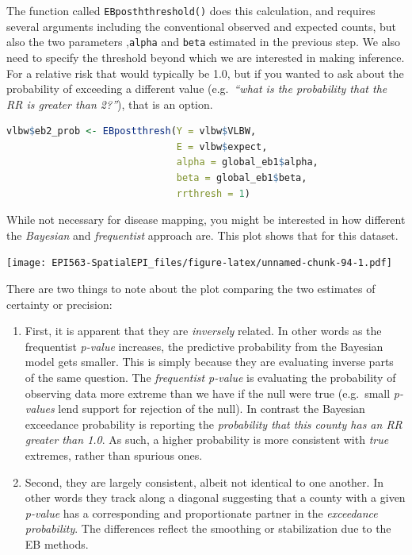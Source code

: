 \documentclass[
]{book}
\newcommand{\passthrough}[1]{#1}
\providecommand{\tightlist}{%
  \setlength{\itemsep}{0pt}\setlength{\parskip}{0pt}}
\begin{document}
The function called \passthrough{\lstinline!EBposththreshold()!} does this calculation, and requires several arguments including the conventional observed and expected counts, but also the two parameters ,\passthrough{\lstinline!alpha!} and \passthrough{\lstinline!beta!} estimated in the previous step. We also need to specify the threshold beyond which we are interested in making inference. For a relative risk that would typically be 1.0, but if you wanted to ask about the probability of exceeding a different value (e.g.~\emph{``what is the probability that the RR is greater than 2?''}), that is an option.

\begin{lstlisting}[language=R]
vlbw$eb2_prob <- EBpostthresh(Y = vlbw$VLBW, 
                              E = vlbw$expect, 
                              alpha = global_eb1$alpha, 
                              beta = global_eb1$beta, 
                              rrthresh = 1)
\end{lstlisting}

While not necessary for disease mapping, you might be interested in how different the \emph{Bayesian} and \emph{frequentist} approach are. This plot shows that for this dataset.

\texttt{[image: EPI563-SpatialEPI\_files/figure-latex/unnamed-chunk-94-1.pdf]}

There are two things to note about the plot comparing the two estimates of certainty or precision:

\begin{enumerate}
\def\labelenumi{\arabic{enumi}.}
\tightlist
\item
  First, it is apparent that they are \emph{inversely} related. In other words as the frequentist \emph{p-value} increases, the predictive probability from the Bayesian model gets smaller. This is simply because they are evaluating inverse parts of the same question. The \emph{frequentist p-value} is evaluating the probability of observing data more extreme than we have if the null were true (e.g.~small \emph{p-values} lend support for rejection of the null). In contrast the Bayesian exceedance probability is reporting the \emph{probability that this county has an RR greater than 1.0}. As such, a higher probability is more consistent with \emph{true} extremes, rather than spurious ones.\\
\item
  Second, they are largely consistent, albeit not identical to one another. In other words they track along a diagonal suggesting that a county with a given \emph{p-value} has a corresponding and proportionate partner in the \emph{exceedance probability}. The differences reflect the smoothing or stabilization due to the EB methods.
\end{enumerate}
\end{document}
